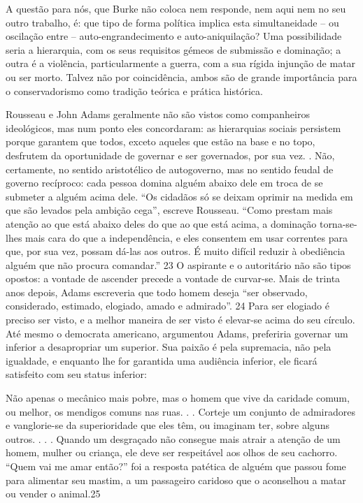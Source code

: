  \par 
A questão para nós, que Burke não coloca nem responde, nem aqui nem no seu outro trabalho, é: que tipo de forma política implica esta simultaneidade – ou oscilação entre – auto-engrandecimento e auto-aniquilação? Uma possibilidade seria a hierarquia, com os seus requisitos gémeos de submissão e dominação; a outra é a violência, particularmente a guerra, com a sua rígida injunção de matar ou ser morto. Talvez não por coincidência, ambos são de grande importância para o conservadorismo como tradição teórica e prática histórica.
 \par 
Rousseau e John Adams geralmente não são vistos como companheiros ideológicos, mas num ponto eles concordaram: as hierarquias sociais persistem porque garantem que todos, exceto aqueles que estão na base e no topo, desfrutem da oportunidade de governar e ser governados, por sua vez. . Não, certamente, no sentido aristotélico de autogoverno, mas no sentido feudal de governo recíproco: cada pessoa domina alguém abaixo dele em troca de se submeter a alguém acima dele. “Os cidadãos só se deixam oprimir na medida em que são levados pela ambição cega”, escreve Rousseau. “Como prestam mais atenção ao que está abaixo deles do que ao que está acima, a dominação torna-se-lhes mais cara do que a independência, e eles consentem em usar correntes para que, por sua vez, possam dá-las aos outros. É muito difícil reduzir à obediência alguém que não procura comandar.” {\color{blue}23} O aspirante e o autoritário não são tipos opostos: a vontade de ascender precede a vontade de curvar-se. Mais de trinta anos depois, Adams escreveria que todo homem deseja “ser observado, considerado, estimado, elogiado, amado e admirado”. {\color{blue}24} Para ser elogiado é preciso ser visto, e a melhor maneira de ser visto é elevar-se acima do seu círculo. Até mesmo o democrata americano, argumentou Adams, preferiria governar um inferior a desapropriar um superior. Sua paixão é pela supremacia, não pela igualdade, e enquanto lhe for garantida uma audiência inferior, ele ficará satisfeito com seu status inferior:
 \par 
Não apenas o mecânico mais pobre, mas o homem que vive da caridade comum, ou melhor, os mendigos comuns nas ruas. . . Corteje um conjunto de admiradores e vanglorie-se da superioridade que eles têm, ou imaginam ter, sobre alguns outros. . . . Quando um desgraçado não consegue mais atrair a atenção de um homem, mulher ou criança, ele deve ser respeitável aos olhos de seu cachorro. “Quem vai me amar então?” foi a resposta patética de alguém que passou fome para alimentar seu mastim, a um passageiro caridoso que o aconselhou a matar ou vender o animal.{\color{blue}25}
